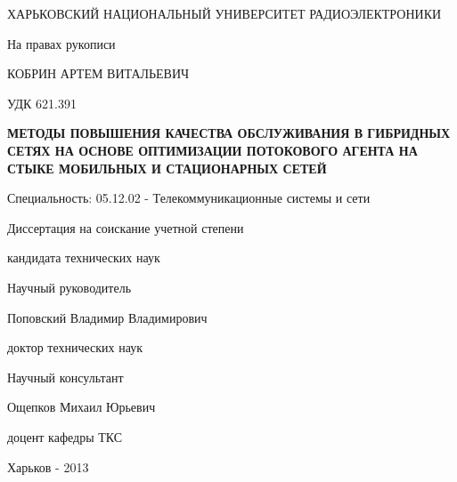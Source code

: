 \begin{titlepage}

 ХАРЬКОВСКИЙ НАЦИОНАЛЬНЫЙ УНИВЕРСИТЕТ РАДИОЭЛЕКТРОНИКИ

 \vspace*{3.5em plus .6em minus .5em}
\begin{flushright}
 На правах рукописи
\end{flushright}

 \vspace*{3.5em plus .6em minus .5em}
\MakeUppercase{Кобрин Артем Витальевич}

 \vspace*{1.5em plus .6em minus .5em}
\begin{flushright}
 УДК 621.391
\end{flushright}

 \vspace*{1.5em plus .6em minus .5em}
\MakeUppercase{\textbf{Методы повышения качества обслуживания в гибридных сетях на основе оптимизации 
потокового агента на стыке мобильных и стационарных сетей}}

 \vspace*{3.5em plus .6em minus .5em}
Специальность: 05.12.02 - Телекоммуникационные системы и сети
 \vspace*{3.5em plus .6em minus .5em}
 
 Диссертация на соискание учетной степени 
 
 кандидата технических наук

  \vspace*{2em plus .6em minus .5em}
\begin{flushleft}

\hangindent=8cm  \noindent
 Научный руководитель

 Поповский Владимир Владимирович

 доктор технических наук
 
 \vspace*{1em plus .6em minus .5em}
 
 Научный консультант
 
 Ощепков Михаил Юрьевич
 
 доцент кафедры ТКС

\end{flushleft}

 
  \vspace*{2em plus .6em minus .5em}
 Харьков - 2013
 
\end{titlepage}
